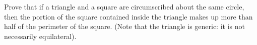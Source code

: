Prove that if a triangle and a square
are circumscribed about the same circle,
then the portion of the square contained inside the triangle
makes up more than half of the perimeter of the square. \newline
(Note that the triangle is generic: it is not necessarily equilateral).
